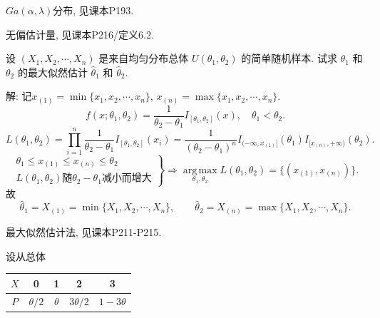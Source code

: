 \documentclass[standard]{ExBook}
\renewenvironment{shaded}{%
  \def\FrameCommand{\fboxsep=\FrameSep \colorbox{shadecolor}}%
  \MakeFramed{\advance\hsize-\width \FrameRestore}%
}{%
  \endMakeFramed
}
\begin{document}
\begin{qitems}
\textcolor{themeColor}{\selectfont {} $Ga(\alpha,\lambda)$分布, 见课本P193.}

\textcolor{themeColor}{\selectfont {} 无偏估计量, 见课本P216/定义6.2.}

\vspace{2.5cm-5em}

    \begin{bbox}
    \begin{shaded}
        \qitem
设 \((X_1, X_2, \cdots, X_n)\) 是来自均匀分布总体 \(U(\theta_1, \theta_2)\) 的简单随机样本. 试求 \(\theta_1\) 和 \(\theta_2\) 的最大似然估计 \(\hat{\theta}_1\) 和 \(\hat{\theta}_2\).
    \end{shaded}
    \end{bbox}

\vspace{\dimexpr2.5cm-5em\relax}

解: 记$x_{(1)}=\min\{x_1,x_2,\cdots,x_n\}$, $x_{(n)}=\max\{x_1,x_2,\cdots,x_n\}$.
$$
f(x;\theta_1,\theta_2)
=
\frac{1}{\theta_2-\theta_1}I_{[\theta_1,\theta_2]}(x),
\quad \theta_1<\theta_2.
$$
$$
L(\theta_1,\theta_2)
=
\prod_{i=1}^{n}
\frac{1}{\theta_2-\theta_1}I_{[\theta_1,\theta_2]}(x_i)
=
\frac{1}{(\theta_2-\theta_1)^n}
I_{(-\infty,x_{(1)}]}(\theta_1)
I_{[x_{(n)},+\infty)}(\theta_2).
$$
$$
\left.
\begin{array}{r}
\theta_1\leq x_{(1)}\leq x_{(n)}\leq \theta_2\\[0.4em]
L(\theta_1,\theta_2)\text{随}\theta_2-\theta_1\text{减小而增大}
\end{array}
\right\}
\Longrightarrow
\operatorname*{arg\,max}_{\theta_1,\theta_2}L(\theta_1,\theta_2)
=
\{(x_{(1)},x_{(n)})\}.
$$
故
$$
\hat{\theta}_1=X_{(1)}=\min\{X_1,X_2,\cdots,X_n\},
\qquad
\hat{\theta}_2=X_{(n)}=\max\{X_1,X_2,\cdots,X_n\}.
$$

\textcolor{themeColor}{\selectfont {} 最大似然估计法, 见课本P211-P215.}

\vspace{2.5cm-5em}

    \begin{bbox}
    \begin{shaded}
        \qitem
设从总体  

\begin{center}
\setlength{\tabcolsep}{39pt}
\begin{tabular}{c|cccc}
\hline
\(X\) & 0 & 1 & 2 & 3 \\
\hline
\(P\) & \(\theta/2\) & \(\theta\) & \(3\theta/2\) & \(1-3\theta\) \\
\hline
\end{tabular}
\end{center}


\end{shaded}
\end{bbox}
\end{qitems}
\end{document}
